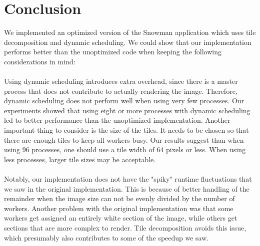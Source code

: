 \chapter{Conclusion}
We implemented an optimized version of the Snowman application which uses tile decomposition and dynamic scheduling. We could show that our implementation performs better than the unoptimized code when keeping the following considerations in mind:\\
\\
Using dynamic scheduling introduces extra overhead, since there is a master process that does not contribute to actually rendering the image. Therefore, dynamic scheduling does not perform well when using very few processes. Our experiments showed that using eight or more processes with dynamic scheduling led to better performance than the unoptimized implementation. Another important thing to consider is the size of the tiles. It needs to be chosen so that there are enough tiles to keep all workers busy. Our results suggest than when using 96 processes, one should use a tile width of 64 pixels or less. When using less processes, larger tile sizes may be acceptable.\\
\\
Notably, our implementation does not have the "spiky" runtime fluctuations that we saw in the original implementation. This is because of better handling of the remainder when the image size can not be evenly divided by the number of workers. Another problem with the original implementation was that some workers get assigned an entirely white section of the image, while others get sections that are more complex to render. Tile decomposition avoids this issue, which presumably also contributes to some of the speedup we saw.